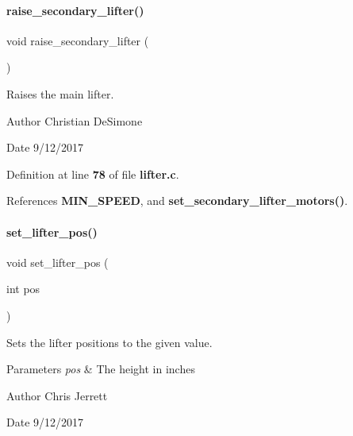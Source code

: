 \mbox{\label{lifter_8h_a786f679ea48bb8c80e00fbac9a69911b}} 
\paragraph{raise\+\_\+secondary\+\_\+lifter()}
{\footnotesize\ttfamily void raise\+\_\+secondary\+\_\+lifter (\begin{DoxyParamCaption}{ }\end{DoxyParamCaption})}



Raises the main lifter. 

\begin{DoxyAuthor}{Author}
Christian De\+Simone 
\end{DoxyAuthor}
\begin{DoxyDate}{Date}
9/12/2017 
\end{DoxyDate}


Definition at line \textbf{ 78} of file \textbf{ lifter.\+c}.



References \textbf{ M\+I\+N\+\_\+\+S\+P\+E\+ED}, and \textbf{ set\+\_\+secondary\+\_\+lifter\+\_\+motors()}.

\mbox{\label{lifter_8h_abddc7cb502e12fa277b627c90a45efb1}} 
\paragraph{set\+\_\+lifter\+\_\+pos()}
{\footnotesize\ttfamily void set\+\_\+lifter\+\_\+pos (\begin{DoxyParamCaption}\item[{int}]{pos }\end{DoxyParamCaption})}



Sets the lifter positions to the given value. 


\begin{DoxyParams}{Parameters}
{\em pos} & The height in inches \\
\hline
\end{DoxyParams}
\begin{DoxyAuthor}{Author}
Chris Jerrett 
\end{DoxyAuthor}
\begin{DoxyDate}{Date}
9/12/2017 
\end{DoxyDate}



